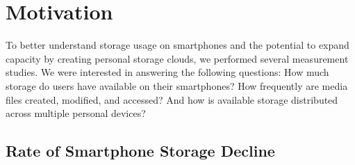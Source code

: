 
\section{Motivation}
\label{sec-motivation}

To better understand storage usage on smartphones and the potential to expand
capacity by creating personal storage clouds, we performed several
measurement studies. We were interested in answering the following questions:
How much storage do users have available on their smartphones? How frequently
are media files created, modified, and accessed? And how is available storage
distributed across multiple personal devices?

\subsection{Rate of Smartphone Storage Decline}

